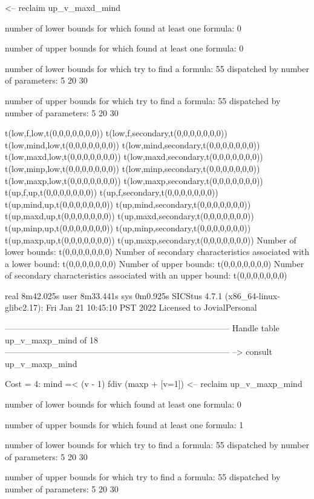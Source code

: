 <-- reclaim up_v_maxd_mind

number of lower bounds for which found at least one formula: 0

number of upper bounds for which found at least one formula: 0

number of lower bounds for which try to find a formula: 55
dispatched by number of parameters: 5  20  30

number of upper bounds for which try to find a formula: 55
dispatched by number of parameters: 5  20  30

t(low,f,low,t(0,0,0,0,0,0,0))
t(low,f,secondary,t(0,0,0,0,0,0,0))
t(low,mind,low,t(0,0,0,0,0,0,0))
t(low,mind,secondary,t(0,0,0,0,0,0,0))
t(low,maxd,low,t(0,0,0,0,0,0,0))
t(low,maxd,secondary,t(0,0,0,0,0,0,0))
t(low,minp,low,t(0,0,0,0,0,0,0))
t(low,minp,secondary,t(0,0,0,0,0,0,0))
t(low,maxp,low,t(0,0,0,0,0,0,0))
t(low,maxp,secondary,t(0,0,0,0,0,0,0))
t(up,f,up,t(0,0,0,0,0,0,0))
t(up,f,secondary,t(0,0,0,0,0,0,0))
t(up,mind,up,t(0,0,0,0,0,0,0))
t(up,mind,secondary,t(0,0,0,0,0,0,0))
t(up,maxd,up,t(0,0,0,0,0,0,0))
t(up,maxd,secondary,t(0,0,0,0,0,0,0))
t(up,minp,up,t(0,0,0,0,0,0,0))
t(up,minp,secondary,t(0,0,0,0,0,0,0))
t(up,maxp,up,t(0,0,0,0,0,0,0))
t(up,maxp,secondary,t(0,0,0,0,0,0,0))
Number of lower bounds:                                             t(0,0,0,0,0,0,0)
Number of secondary characteristics associated with a lower bound:  t(0,0,0,0,0,0,0)
Number of upper bounds:                                             t(0,0,0,0,0,0,0)
Number of secondary characteristics associated with an upper bound: t(0,0,0,0,0,0,0)

real	8m42.025s
user	8m33.441s
sys	0m0.925s
SICStus 4.7.1 (x86_64-linux-glibc2.17): Fri Jan 21 10:45:10 PST 2022
Licensed to JovialPersonal


--------------------------------------------------------------------------------
Handle table up_v_maxp_mind of 18
--------------------------------------------------------------------------------
--> consult up_v_maxp_mind

Cost =  4:  mind =< (v - 1) fdiv (maxp + [v=1]) %
<-- reclaim up_v_maxp_mind

number of lower bounds for which found at least one formula: 0

number of upper bounds for which found at least one formula: 1

number of lower bounds for which try to find a formula: 55
dispatched by number of parameters: 5  20  30

number of upper bounds for which try to find a formula: 55
dispatched by number of parameters: 5  20  30

